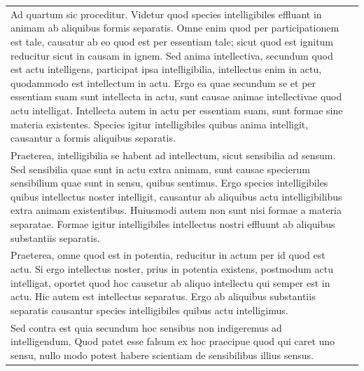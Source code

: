 \documentclass[paper=a4paper,fontsize=10pt,jafontsize=9pt,titlepage]{jlreq}
\begin{document}
\begin{longtable}{p{21em}p{21em}}

 Ad quartum sic proceditur. Videtur quod species intelligibiles effluant in animam ab aliquibus formis separatis. Omne enim quod per participationem est tale, causatur ab eo quod est per essentiam tale; sicut quod est ignitum reducitur sicut in causam in ignem. Sed anima intellectiva, secundum quod est actu intelligens, participat ipsa intelligibilia, intellectus enim in actu, quodammodo est intellectum in actu. Ergo ea quae secundum se et per essentiam suam sunt intellecta in actu, sunt causae animae intellectivae quod actu intelligat. Intellecta autem in actu per essentiam suam, sunt formae sine materia existentes. Species igitur intelligibiles quibus anima intelligit, causantur a formis aliquibus separatis.

 
&



\\[1em]




 Praeterea, intelligibilia se habent ad intellectum, sicut sensibilia ad sensum. Sed sensibilia quae sunt in actu extra animam, sunt causae specierum sensibilium quae sunt in sensu, quibus sentimus. Ergo species intelligibiles quibus intellectus noster intelligit, causantur ab aliquibus actu intelligibilibus extra animam existentibus. Huiusmodi autem non sunt nisi formae a materia separatae. Formae igitur intelligibiles intellectus nostri effluunt ab aliquibus substantiis separatis.

  
&



\\[1em]





 Praeterea, omne quod est in potentia, reducitur in actum per id quod est actu. Si ergo intellectus noster, prius in potentia existens, postmodum actu intelligat, oportet quod hoc causetur ab aliquo intellectu qui semper est in actu. Hic autem est intellectus separatus. Ergo ab aliquibus substantiis separatis causantur species intelligibiles quibus actu intelligimus.

  
&



\\[1em]





 Sed contra est quia secundum hoc sensibus non indigeremus ad intelligendum. Quod patet esse falsum ex hoc praecipue quod qui caret uno sensu, nullo modo potest habere scientiam de sensibilibus illius sensus.


\end{longtable}
\end{document}
